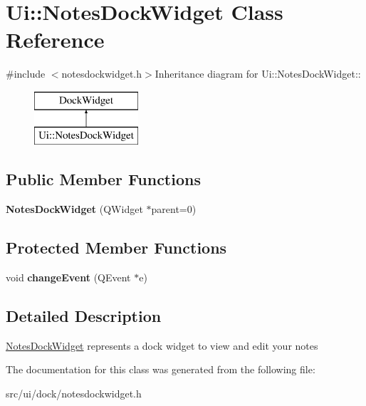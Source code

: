 \hypertarget{classUi_1_1NotesDockWidget}{
\section{Ui::NotesDockWidget Class Reference}
\label{classUi_1_1NotesDockWidget}
}


{\ttfamily \#include $<$notesdockwidget.h$>$}Inheritance diagram for Ui::NotesDockWidget::\begin{figure}[H]
\begin{center}
\leavevmode
\includegraphics[height=2cm]{classUi_1_1NotesDockWidget}
\end{center}
\end{figure}
\subsection*{Public Member Functions}
\begin{DoxyCompactItemize}
\item 
\hypertarget{classUi_1_1NotesDockWidget_a67ca10e88983f3f6d88e567ce9f2b046}{
{\bfseries NotesDockWidget} (QWidget $\ast$parent=0)}
\label{classUi_1_1NotesDockWidget_a67ca10e88983f3f6d88e567ce9f2b046}

\end{DoxyCompactItemize}
\subsection*{Protected Member Functions}
\begin{DoxyCompactItemize}
\item 
\hypertarget{classUi_1_1NotesDockWidget_a3a4fc9ce8eee96bb50a90b59f779df14}{
void {\bfseries changeEvent} (QEvent $\ast$e)}
\label{classUi_1_1NotesDockWidget_a3a4fc9ce8eee96bb50a90b59f779df14}

\end{DoxyCompactItemize}


\subsection{Detailed Description}
\hyperlink{classUi_1_1NotesDockWidget}{NotesDockWidget} represents a dock widget to view and edit your notes 

The documentation for this class was generated from the following file:\begin{DoxyCompactItemize}
\item 
src/ui/dock/notesdockwidget.h\end{DoxyCompactItemize}
